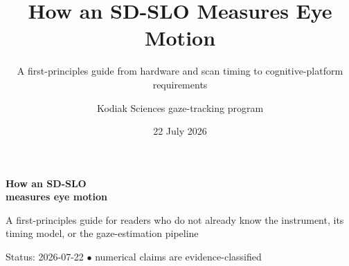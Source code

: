 \documentclass[aspectratio=169,9pt,xcolor=table]{beamer}
\title{How an SD-SLO Measures Eye Motion}
\subtitle{A first-principles guide from hardware and scan timing to cognitive-platform requirements}
\author{Kodiak Sciences gaze-tracking program}
\date{22 July 2026}
\begin{document}
\begin{frame}[plain]
  \vspace{0.85cm}
  \hspace{1.35cm}
  \begin{minipage}{0.70\paperwidth}
    {\color{white}\fontsize{26}{29}\selectfont\bfseries
      How an SD-SLO\\measures eye motion\par}
    \vspace{0.5cm}
    {\color{PaleTeal}\Large
      A first-principles guide for readers who do not already know the instrument,
      its timing model, or the gaze-estimation pipeline\par}
    \vspace{1.0cm}
    {\color{white}\small Status: 2026-07-22 \quad$\bullet$\quad
      numerical claims are evidence-classified}
  \end{minipage}
\end{frame}
\end{document}
